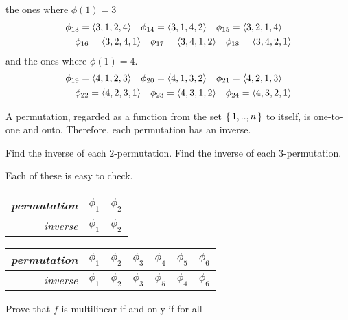 \begin{exercises}
\begin{answer}
      the ones where $\phi(1)=3$
      \begin{align*}
        &\phi_{13}=\langle3,1,2,4\rangle
        \quad
        \phi_{14}=\langle3,1,4,2\rangle
        \quad
        \phi_{15}=\langle3,2,1,4\rangle  \\
        &\quad
        \phi_{16}=\langle3,2,4,1\rangle
        \quad
        \phi_{17}=\langle3,4,1,2\rangle
        \quad
        \phi_{18}=\langle3,4,2,1\rangle
      \end{align*}
      and the ones where $\phi(1)=4$.
      \begin{align*}
        &\phi_{19}=\langle4,1,2,3\rangle
        \quad
        \phi_{20}=\langle4,1,3,2\rangle
        \quad
        \phi_{21}=\langle4,2,1,3\rangle  \\
        &\quad
        \phi_{22}=\langle4,2,3,1\rangle
        \quad
        \phi_{23}=\langle4,3,1,2\rangle
        \quad
        \phi_{24}=\langle4,3,2,1\rangle
      \end{align*}
    \end{answer}
  \item 
    A permutation, regarded as a function from the set
    $\mbox{$\{\,1,..,n\,\}$}$ to itself, is one-to-one and onto.
    Therefore, each permutation has an inverse. 
    \begin{exparts}
      \partsitem Find the inverse of each $2$-permutation.
      \partsitem Find the inverse of each $3$-permutation.
    \end{exparts}
    \begin{answer}
      Each of these is easy to check.
      \begin{exparts*}
        \partsitem 
          \begin{tabular}[t]{r|cc}
            \textit{permutation} &$\phi_1$  &$\phi_2$ \\
             \hline
            \textit{inverse}     &$\phi_1$  &$\phi_2$ 
          \end{tabular}
        \partsitem 
          \begin{tabular}[t]{r|cccccc}
            \textit{permutation} 
              &$\phi_1$ &$\phi_2$ &$\phi_3$ &$\phi_4$ &$\phi_5$ &$\phi_6$ \\
            \hline
            \textit{inverse}
              &$\phi_1$ &$\phi_2$ &$\phi_3$ &$\phi_5$ &$\phi_4$ &$\phi_6$ 
          \end{tabular}
      \end{exparts*}
    \end{answer}
  \item 
     Prove that \( f \) is multilinear if and only if for all

\end{exercises}
